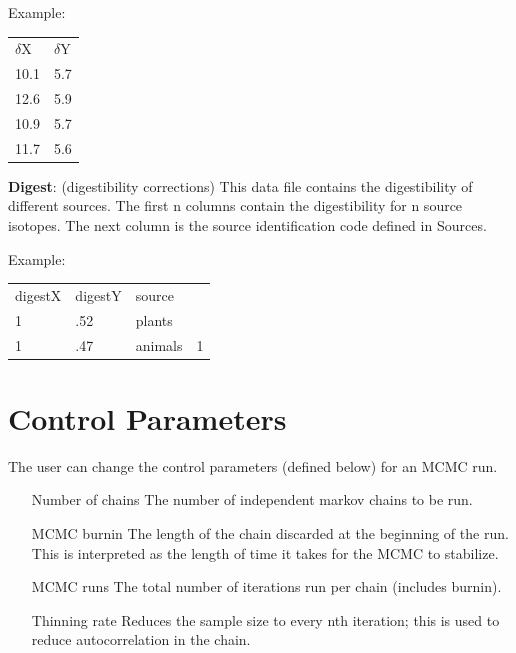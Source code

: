 \documentclass{article}
\begin{document}
Example:
\begin{center}
\begin{tabular}{ll}
$\delta$X & $\delta$Y \\
10.1 & 5.7\\
12.6 & 5.9\\
10.9 & 5.7\\
11.7 & 5.6\\
\end{tabular}
\end{center}


\textbf{Digest}: (digestibility corrections) This data file contains the digestibility of different sources. The first n columns contain the digestibility for n source isotopes. The next column is the source identification code defined in Sources. 

Example:
\begin{center}
\begin{tabular}{llll}
digestX & digestY & source\\
1 & .52 & plants \\
1 & .47 & animals & 1\\
\end{tabular}
\end{center}


\section*{Control Parameters}
The user can change the control parameters (defined below) for an MCMC run.
\begin{itemize}
 \item[Number of chains] The number of independent markov chains to be run.
 \item[MCMC burnin] The length of the chain discarded at the beginning of the run. This is interpreted as the length of time it takes for the MCMC to stabilize.
  \item[MCMC runs] The total number of iterations run per chain (includes burnin).
  \item[Thinning rate] Reduces the sample size to every nth iteration; this is used to reduce autocorrelation in the chain.
\end{itemize}
\end{document}
